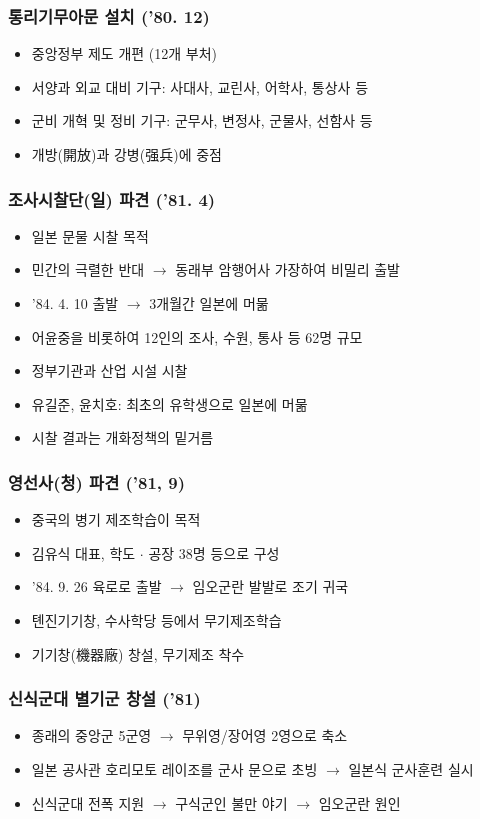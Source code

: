 \subsubsection*{통리기무아문 설치 ('80. 12)}
\begin{itemize}
    \item 중앙정부 제도 개편 (12개 부처)
    \item 서양과 외교 대비 기구: 사대사, 교린사, 어학사, 통상사 등
    \item 군비 개혁 및 정비 기구: 군무사, 변정사, 군물사, 선함사 등
    \item 개방(開放)과 강병(强兵)에 중점
\end{itemize}

\subsubsection*{조사시찰단(일) 파견 ('81. 4)}
\begin{itemize}
    \item 일본 문물 시찰 목적
    \item 민간의 극렬한 반대 $\rightarrow$ 동래부 암행어사 가장하여 비밀리 출발
    \item '84. 4. 10 출발 $\rightarrow$ 3개월간 일본에 머묾
    \item 어윤중을 비롯하여 12인의 조사, 수원, 통사 등 62명 규모
    \item 정부기관과 산업 시설 시찰
    \item 유길준, 윤치호: 최초의 유학생으로 일본에 머묾
    \item 시찰 결과는 개화정책의 밑거름
\end{itemize}
\pagebreak

\subsubsection*{영선사(청) 파견 ('81, 9)}
\begin{itemize}
    \item 중국의 병기 제조학습이 목적
    \item 김유식 대표, 학도 $\cdot$ 공장 38명 등으로 구성
    \item '84. 9. 26 육로로 출발 $\rightarrow$ 임오군란 발발로 조기 귀국
    \item 톈진기기창, 수사학당 등에서 무기제조학습
    \item 기기창(機器廠) 창설, 무기제조 착수
\end{itemize}

\subsubsection*{신식군대 별기군 창설 ('81)}
\begin{itemize}
    \item 종래의 중앙군 5군영 $\rightarrow$ 무위영/장어영 2영으로 축소
    \item 일본 공사관 호리모토 레이조를 군사 문으로 초빙 $\rightarrow$ 일본식 군사훈련 실시
    \item 신식군대 전폭 지원 $\rightarrow$ 구식군인 불만 야기 $\rightarrow$ 임오군란 원인
\end{itemize}

